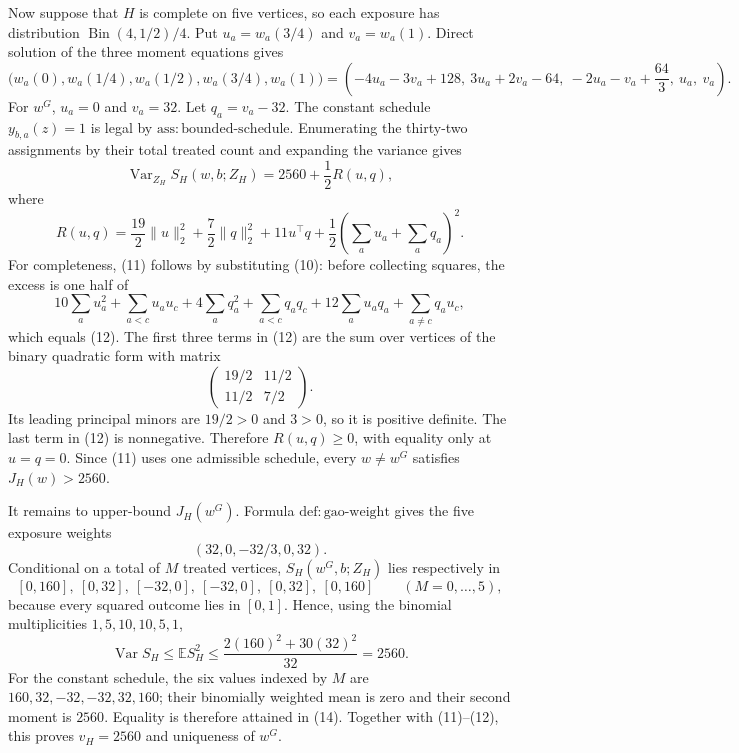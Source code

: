 Now suppose that \(H\) is complete on five vertices, so each exposure has distribution \(\operatorname{Bin}(4,1/2)/4\).  Put \(u_a=w_a(3/4)\) and \(v_a=w_a(1)\).  Direct solution of the three moment equations gives
\[
\bigl(w_a(0),w_a(1/4),w_a(1/2),w_a(3/4),w_a(1)\bigr)
=\left(-4u_a-3v_a+128,\ 3u_a+2v_a-64,\ -2u_a-v_a+\frac{64}{3},\ u_a,\ v_a\right). \tag{10}
\]
For \(w^G\), \(u_a=0\) and \(v_a=32\).  Let \(q_a=v_a-32\).  The constant schedule \(y_{b,a}(z)=1\) is legal by \(\mathrm{ass:bounded\text{-}schedule}\).  Enumerating the thirty-two assignments by their total treated count and expanding the variance gives
\[
\operatorname{Var}_{Z_H}S_H(w,b;Z_H)=2560+\frac12R(u,q), \tag{11}
\]
where
\[
R(u,q)=\frac{19}{2}\|u\|_2^2+\frac72\|q\|_2^2+11u^\top q+\frac12\left(\sum_a u_a+\sum_a q_a\right)^2. \tag{12}
\]
For completeness, (11) follows by substituting (10): before collecting squares, the excess is one half of
\[
10\sum_a u_a^2+\sum_{a<c}u_au_c+4\sum_a q_a^2+\sum_{a<c}q_aq_c
+12\sum_a u_aq_a+\sum_{a\ne c}q_au_c,
\]
which equals (12).  The first three terms in (12) are the sum over vertices of the binary quadratic form with matrix
\[
\begin{pmatrix}19/2&11/2\\11/2&7/2\end{pmatrix}.
\]
Its leading principal minors are \(19/2>0\) and \(3>0\), so it is positive definite.  The last term in (12) is nonnegative.  Therefore \(R(u,q)\ge0\), with equality only at \(u=q=0\).  Since (11) uses one admissible schedule, every \(w\ne w^G\) satisfies \(J_H(w)>2560\).

It remains to upper-bound \(J_H(w^G)\).  Formula \(\mathrm{def:gao\text{-}weight}\) gives the five exposure weights
\[
(32,0,-32/3,0,32).
\]
Conditional on a total of \(M\) treated vertices, \(S_H(w^G,b;Z_H)\) lies respectively in
\[
[0,160],\ [0,32],\ [-32,0],\ [-32,0],\ [0,32],\ [0,160]\qquad(M=0,\ldots,5), \tag{13}
\]
because every squared outcome lies in \([0,1]\).  Hence, using the binomial multiplicities \(1,5,10,10,5,1\),
\[
\operatorname{Var}S_H\le\mathbb E S_H^2
\le\frac{2(160)^2+30(32)^2}{32}=2560. \tag{14}
\]
For the constant schedule, the six values indexed by \(M\) are \(160,32,-32,-32,32,160\); their binomially weighted mean is zero and their second moment is \(2560\).  Equality is therefore attained in (14).  Together with (11)--(12), this proves \(v_H=2560\) and uniqueness of \(w^G\).

